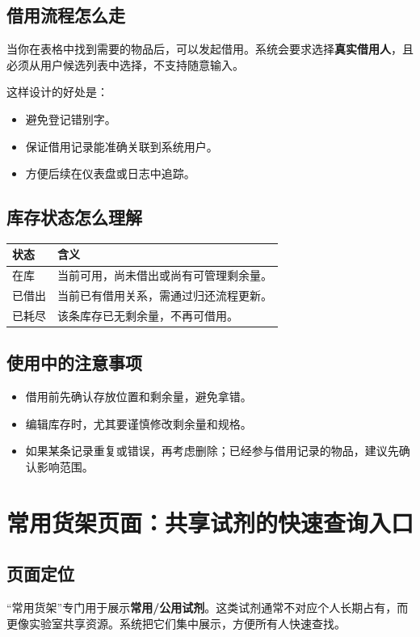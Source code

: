 \documentclass[12pt,a4paper]{ctexart}
\begin{document}
\subsection{借用流程怎么走}
当你在表格中找到需要的物品后，可以发起借用。系统会要求选择\textbf{真实借用人}，且必须从用户候选列表中选择，不支持随意输入。

这样设计的好处是：
\begin{itemize}
  \item 避免登记错别字。
  \item 保证借用记录能准确关联到系统用户。
  \item 方便后续在仪表盘或日志中追踪。
\end{itemize}

\subsection{库存状态怎么理解}
\begin{longtable}{p{3cm} p{10cm}}
\toprule
状态 & 含义 \\
\midrule
在库 & 当前可用，尚未借出或尚有可管理剩余量。 \\
已借出 & 当前已有借用关系，需通过归还流程更新。 \\
已耗尽 & 该条库存已无剩余量，不再可借用。 \\
\bottomrule
\end{longtable}

\subsection{使用中的注意事项}
\begin{itemize}
  \item 借用前先确认存放位置和剩余量，避免拿错。 
  \item 编辑库存时，尤其要谨慎修改剩余量和规格。
  \item 如果某条记录重复或错误，再考虑删除；已经参与借用记录的物品，建议先确认影响范围。
\end{itemize}

\newpage
\section{常用货架页面：共享试剂的快速查询入口}

\subsection{页面定位}
“常用货架”专门用于展示\textbf{常用/公用试剂}。这类试剂通常不对应个人长期占有，而更像实验室共享资源。系统把它们集中展示，方便所有人快速查找。
\end{document}
